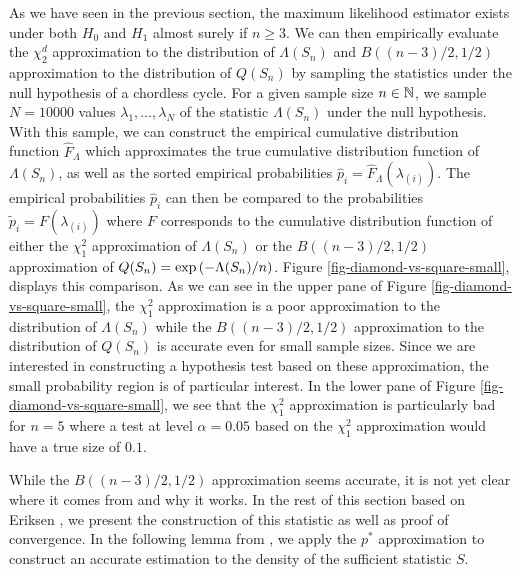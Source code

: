 As we have seen in the previous section, the maximum likelihood estimator exists under both $H_0$ and $H_1$ almost surely if $n \geq 3$. We can then empirically evaluate the $\chi_2^d$ approximation to the distribution of $\Lambda(S_n)$ and $B((n - 3)/2, 1/2)$ approximation to the distribution of $Q(S_n)$ by sampling the statistics under the null hypothesis of a chordless cycle. For a given sample size $n \in \mathbb{N}$, we sample $N = 10000$ values $\lambda_1, \ldots, \lambda_N$ of the statistic $\Lambda(S_n)$ under the null hypothesis. With this sample, we can construct the empirical cumulative distribution function $\hat F_\Lambda$ which approximates the true cumulative distribution function of $\Lambda(S_n)$, as well as the sorted empirical probabilities $\hat p_{i} = \hat F_\Lambda(\lambda_{(i)})$. The empirical probabilities $\hat p_{i}$ can then be compared to the probabilities $\tilde p_i = F(\lambda_{(i)})$ where $F$ corresponds to the cumulative distribution function of either the $\chi^2_1$ approximation of $\Lambda(S_n)$ or the $B((n - 3)/2, 1/2)$ approximation of $Q(S_n) = \exp\left(-\Lambda(S_n) / n\right)$. Figure \ref{fig-diamond-vs-square-small}, displays this comparison. As we can see in the upper pane of Figure \ref{fig-diamond-vs-square-small}, the $\chi^2_1$ approximation is a poor approximation to the distribution of $\Lambda(S_n)$ while the $B((n - 3)/2, 1/2)$ approximation to the distribution of $Q(S_n)$ is accurate even for small sample sizes. Since we are interested in constructing a hypothesis test based on these approximation, the small probability region is of particular interest. In the lower pane of Figure \ref{fig-diamond-vs-square-small}, we see that the $\chi^2_1$ approximation is particularly bad for $n=5$ where a test at level $\alpha=0.05$ based on the $\chi^2_1$ approximation would have a true size of $0.1$.



While the $B((n - 3)/2, 1/2)$ approximation seems accurate, it is not yet clear where it comes from and why it works. In the rest of this section based on Eriksen \cite{eriksen1996tests}, we present the construction of this statistic as well as proof of convergence. In the following lemma from \cite[Theorem 3.1]{eriksen1996tests}, we apply the $p^*$ approximation to construct an accurate estimation to the density of the sufficient statistic $S$.

